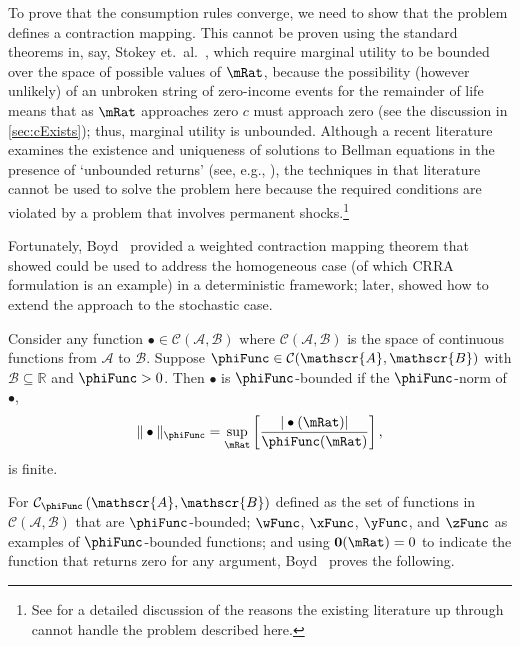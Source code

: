 \documentclass[BufferStockTheory]{subfiles}
\begin{document}
To prove that the consumption rules converge, we need to show that the
problem defines a contraction mapping. This cannot be proven using the
standard theorems in, say, Stokey et.\ al.~\citeyearpar{slpMethods},
which require marginal utility to be bounded over the space of
possible values of $\mRat$, because the possibility (however unlikely)
of an unbroken string of zero-income events for the remainder of life
means that as $\mRat$ approaches zero $c$ must approach zero (see the
discussion in \ref{sec:cExists}); thus, marginal utility is unbounded.
Although a recent literature examines the existence and uniqueness 
of solutions to Bellman equations in the presence of `unbounded returns' (see, e.g.,
\cite{mnUnique}), the techniques in that literature
cannot be used to solve the problem here because the required conditions 
are violated by a problem that involves permanent shocks.\footnote{See \cite{yaoNote}
  for a detailed discussion of the reasons the existing literature up through \cite{mnUnique} cannot handle 
  the problem described here.}

Fortunately, Boyd~\citeyearpar{jboydWeighted} provided a weighted contraction mapping theorem that \cite{asHomogeneous} showed could be used to address the homogeneous case (of which CRRA formulation is an example) in a deterministic framework; later, \cite{duranDiscounting} showed how to extend the \cite{jboydWeighted} approach to the stochastic case.
\begin{defn}
  Consider any function $\bullet\in \mathcal{C}(\mathscr{A},\mathscr{B})$ where $\mathcal{C}(\mathscr{A},\mathscr{B})$ is the space of continuous functions from $\mathscr{A}$ to $%
  \mathscr{B}$. Suppose $\phiFunc \in \mathcal{C}(\mathscr{A},\mathscr{B})$ with $%
  \mathscr{B}\subseteq\mathbb{R}$ and $\phiFunc >0$. Then $\bullet$ is $\phiFunc$-bounded if the $\phiFunc$-norm of $\bullet$,
  \begin{equation}
    \Vert \bullet\Vert _{\phiFunc }=\sup_{\mRat}\left[ \frac{|\bullet(\mRat)|}{\phiFunc (\mRat)}\right] ,
    \label{eq:phinorm}
  \end{equation}%
  is finite.
\end{defn}

For $\mathcal{C}_{\phiFunc }\left( \mathscr{A},\mathscr{B}\right) $
defined as the set of functions in
$\mathcal{C}(\mathscr{A},\mathscr{B})$ that are $\phiFunc$-bounded;
$\wFunc$, $\xFunc$, $\yFunc$, and $\zFunc$ as examples of
$\phiFunc$-bounded functions; and using $\mathbf{0}(\mRat)=0$ to
indicate the function that returns zero for any argument,
Boyd~\citeyearpar{jboydWeighted} proves the following.
\end{document}
